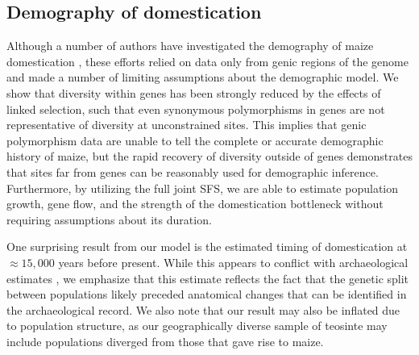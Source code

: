 \documentclass{pnastwo}
\newcommand{\mbh}[1]{\textcolor{blue}{\scriptsize #1}}
\begin{document}
\begin{article}

\subsection{Demography of domestication} %
Although a number of authors have investigated the demography of maize domestication \cite{eyre1998, tenaillon2004selection, wright2005}, these  efforts relied on data only from genic regions of the genome and made a number of limiting assumptions about the demographic model.  We show that diversity within genes has been strongly reduced by the effects of linked selection, such that even synonymous polymorphisms in genes are not representative of diversity at unconstrained sites. This implies that genic polymorphism data are unable to tell the complete or accurate demographic history of maize, but the rapid recovery of diversity outside of genes demonstrates that sites far from genes can be reasonably used for demographic inference. Furthermore, by utilizing the full joint SFS, we are able to estimate population growth, gene flow, and the strength of the domestication bottleneck without requiring assumptions about its duration.  

One surprising result from our model is the estimated timing of domestication at $\approx 15,000$ years before present.
While this appears to conflict with archaeological estimates \cite{piperno2009starch}, we emphasize that this estimate reflects the fact that the genetic split between populations likely preceded anatomical changes that can be identified in the archaeological record. 
We also note that our result may also be inflated due to population structure, as our geographically diverse sample of teosinte may include populations diverged from those that gave rise to maize.


\end{article}
\end{document}
